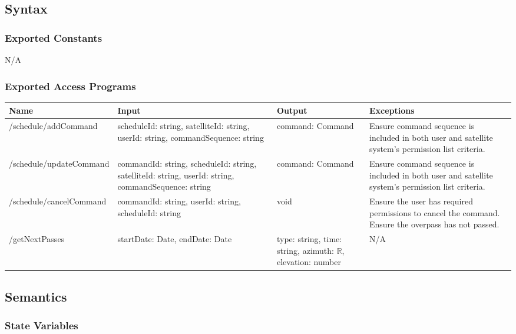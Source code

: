 \documentclass[12pt, titlepage]{article}
\begin{document}
\subsection{Syntax}

\subsubsection{Exported Constants}

N/A

\subsubsection{Exported Access Programs}

\begin{center}
\begin{tabular}{|p{4.8cm} | p{4cm} |p{3cm} |p{5cm}|}
\hline
\textbf{Name} & \textbf{Input} & \textbf{Output} & \textbf{Exceptions} \\
\hline
/schedule/addCommand & scheduleId: string, satelliteId: string, userId: string, commandSequence: string & command: Command
 & Ensure command sequence is included in both user and satellite system’s permission list criteria. \\
\hline
/schedule/updateCommand & commandId: string, scheduleId: string, satelliteId: string, userId: string, commandSequence: string & command: Command & Ensure command sequence is included in both user and satellite system’s permission list criteria. \\
\hline
/schedule/cancelCommand & commandId: string, userId: string, scheduleId: string & void & Ensure the user has required permissions to cancel the command. Ensure the overpass has not passed.
 \\
\hline
/getNextPasses & startDate: Date, endDate: Date & type: string, time: string, azimuth: $\mathbb{R}$, elevation: number & N/A \\
\hline

\end{tabular}

\end{center}

\subsection{Semantics}

\subsubsection{State Variables}
\end{document}
